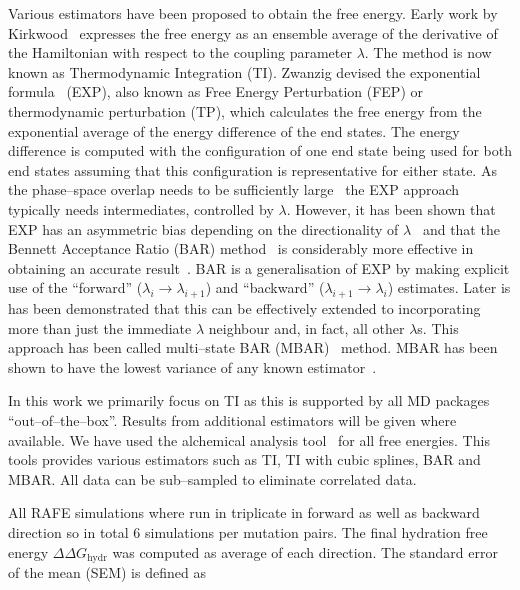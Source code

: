 \documentclass[journal=jctcce,manuscript=article]{achemso}
\begin{document}
Various estimators have been proposed to obtain the free energy.
Early work by Kirkwood~\cite{kirkwood_statistical_1935} expresses the
free energy as an ensemble average of the derivative of the
Hamiltonian with respect to the coupling parameter $\lambda$.  The
method is now known as Thermodynamic Integration (TI).  Zwanzig
devised the exponential formula~\cite{zwanzig_high-temperature_1954}
(EXP), also known as Free Energy Perturbation (FEP) or thermodynamic
perturbation (TP), which calculates the free energy from the
exponential average of the energy difference of the end states.  The
energy difference is computed with the configuration of one end state
being used for both end states assuming that this configuration is
representative for either state.  As the phase--space overlap needs to
be sufficiently large~\cite{wu_phase-space_2005,wu_phase-space_2005-1}
the EXP approach typically needs intermediates, controlled by
$\lambda$.  However, it has been shown that EXP has an asymmetric bias
depending on the directionality of $\lambda$~\cite{wu_asymmetric_2004}
and that the Bennett Acceptance Ratio (BAR)
method~\cite{bennett_efficient_1976} is considerably more effective in
obtaining an accurate result~\cite{lu_appropriate_2003}.  BAR is a
generalisation of EXP by making explicit use of the ``forward''
($\lambda_i \rightarrow \lambda_{i+1}$) and ``backward''
($\lambda_{i+1} \rightarrow \lambda_i$) estimates.  Later is has been
demonstrated that this can be effectively extended to incorporating
more than just the immediate $\lambda$ neighbour and, in fact, all
other $\lambda$s.  This approach has been called multi--state BAR
(MBAR)~\cite{shirts_statistically_2008-1} method.  MBAR has been shown
to have the lowest variance of any known
estimator~\cite{shirts_statistically_2008}.

In this work we primarily focus on TI as this is supported by all MD
packages ``out--of--the--box''.  Results from additional estimators
will be given where available.  We have used the alchemical analysis
tool~\cite{klimovich_guidelines_2015} for all free energies.  This
tools provides various estimators such as TI, TI with cubic splines,
BAR and MBAR.  All data can be sub--sampled to eliminate correlated
data.

All RAFE simulations where run in triplicate in forward as well as
backward direction so in total 6 simulations per mutation pairs.  The
final hydration free energy $\Delta\Delta G_{\mathrm{hydr}}$ was
computed as average of each direction.  The standard error of the
mean (SEM) is defined as
\end{document}
